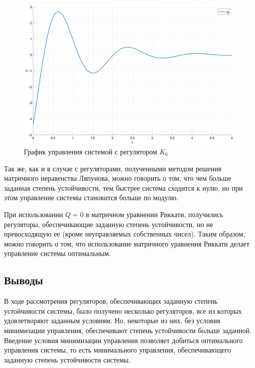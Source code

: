 \begin{figure}[ht!]
    \centering
    \includegraphics[width=\textwidth]{media/plots/task1_8_u.png}
    \caption{График управления системой с регулятором $K_6$}
    \label{fig:task1_8_u}
\end{figure}

\FloatBarrier
Так же, как и в случае с регуляторами, полученными методом решения матричного неравенства Ляпунова,
можно говорить о том, что чем больше заданная степень устойчивости, тем быстрее система 
сходится к нулю, но при этом управление системы становится больше по модулю. 

При использовании $Q = 0$ в матричном уравнении Риккати, получились регуляторы, 
обеспечивающие заданную степень устойчивости, но не превосходящую ее (кроме неуправляемых собственных чисел).
Таким образом, можно говорить о том, что использование матричного уравнения Риккати
делает управление системы оптимальным. 

\subsection{Выводы}
В ходе рассмотрения регуляторов, обеспечивающих заданную степень устойчивости системы, 
было получено несколько регуляторов, все из которых удовлетворяют заданным условиям.
Но, некоторые из них, без условия минимизации управления, обеспечивают степень устойчивости больше заданной.
Введение условия минимизации управления позволяет добиться оптимального управления системы,
то есть минимального управления, обеспечивающего заданную степень устойчивости системы.
